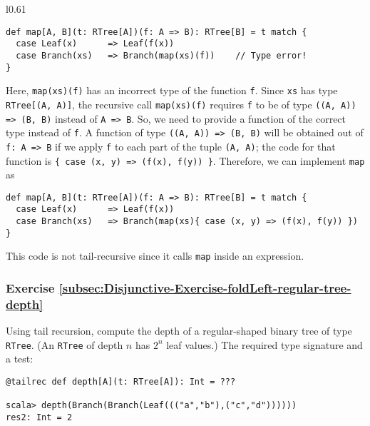 \begin{wrapfigure}{l}{0.61\columnwidth}%
\vspace{-0.5\baselineskip}

\begin{lstlisting}
def map[A, B](t: RTree[A])(f: A => B): RTree[B] = t match {
  case Leaf(x)      => Leaf(f(x))
  case Branch(xs)   => Branch(map(xs)(f))    // Type error!
}
\end{lstlisting}
\vspace{-0.75\baselineskip}
\end{wrapfigure}%

\noindent Here, \lstinline!map(xs)(f)! has an incorrect type of the
function \lstinline!f!. Since \lstinline!xs! has type \lstinline!RTree[(A, A)]!,
the recursive call \lstinline!map(xs)(f)! requires \lstinline!f!
to be of type \lstinline!((A, A)) => (B, B)! instead of \lstinline!A => B!.
So, we need to provide a function of the correct type instead of \lstinline!f!.
A function of type \lstinline!((A, A)) => (B, B)! will be obtained
out of \lstinline!f: A => B! if we apply \lstinline!f! to each part
of the tuple \lstinline!(A, A)!; the code for that function is \lstinline!{ case (x, y) => (f(x), f(y)) }!.
Therefore, we can implement \lstinline!map! as
\begin{lstlisting}
def map[A, B](t: RTree[A])(f: A => B): RTree[B] = t match {
  case Leaf(x)      => Leaf(f(x))
  case Branch(xs)   => Branch(map(xs){ case (x, y) => (f(x), f(y)) })
}
\end{lstlisting}
This code is not tail-recursive since it calls \lstinline!map! inside
an expression.

\subsubsection{Exercise \label{subsec:Disjunctive-Exercise-foldLeft-regular-tree-depth}\ref{subsec:Disjunctive-Exercise-foldLeft-regular-tree-depth}}

Using tail recursion, compute the depth of a regular-shaped binary
tree of type \lstinline!RTree!. (An \lstinline!RTree! of depth $n$
has $2^{n}$ leaf values.) The required type signature and a test:
\begin{lstlisting}
@tailrec def depth[A](t: RTree[A]): Int = ???

scala> depth(Branch(Branch(Leaf((("a","b"),("c","d"))))))
res2: Int = 2
\end{lstlisting}
\begin{comment}
Solution:

\begin{lstlisting}
@tailrec def depth[A](t: RTree[A], acc: Int = 0): Int = t match {
  case Leaf(x)    => acc
  case Branch(xs) => depth(xs, acc + 1)
}
\end{lstlisting}
\end{comment}


